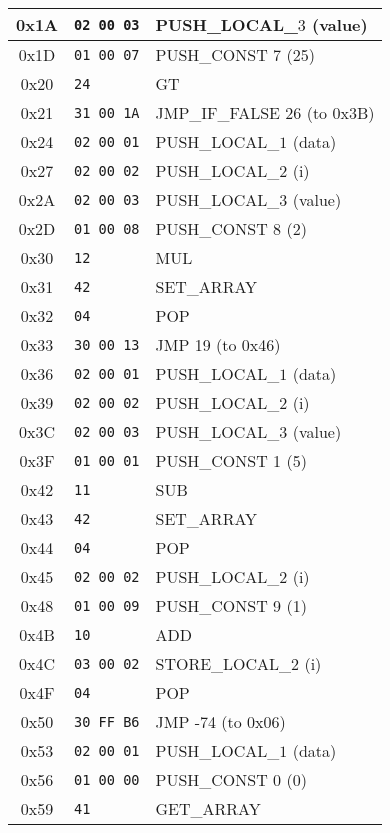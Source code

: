 \documentclass[a4paper,12pt]{article}
\begin{document}
\begin{longtable}{|c|l|p{6cm}|}
    0x1A & \texttt{02 00 03} & PUSH\_LOCAL\_$3$ (value) \\ \hline
    0x1D & \texttt{01 00 07} & PUSH\_CONST 7 (25) \\ \hline
    0x20 & \texttt{24} & GT \\ \hline
    0x21 & \texttt{31 00 1A} & JMP\_IF\_FALSE 26 (to 0x3B) \\ \hline
    0x24 & \texttt{02 00 01} & PUSH\_LOCAL\_$1$ (data) \\ \hline
    0x27 & \texttt{02 00 02} & PUSH\_LOCAL\_$2$ (i) \\ \hline
    0x2A & \texttt{02 00 03} & PUSH\_LOCAL\_$3$ (value) \\ \hline
    0x2D & \texttt{01 00 08} & PUSH\_CONST 8 (2) \\ \hline
    0x30 & \texttt{12} & MUL \\ \hline
    0x31 & \texttt{42} & SET\_ARRAY \\ \hline
    0x32 & \texttt{04} & POP \\ \hline
    0x33 & \texttt{30 00 13} & JMP 19 (to 0x46) \\ \hline
    0x36 & \texttt{02 00 01} & PUSH\_LOCAL\_$1$ (data) \\ \hline
    0x39 & \texttt{02 00 02} & PUSH\_LOCAL\_$2$ (i) \\ \hline
    0x3C & \texttt{02 00 03} & PUSH\_LOCAL\_$3$ (value) \\ \hline
    0x3F & \texttt{01 00 01} & PUSH\_CONST 1 (5) \\ \hline
    0x42 & \texttt{11} & SUB \\ \hline
    0x43 & \texttt{42} & SET\_ARRAY \\ \hline
    0x44 & \texttt{04} & POP \\ \hline
    0x45 & \texttt{02 00 02} & PUSH\_LOCAL\_$2$ (i) \\ \hline
    0x48 & \texttt{01 00 09} & PUSH\_CONST 9 (1) \\ \hline
    0x4B & \texttt{10} & ADD \\ \hline
    0x4C & \texttt{03 00 02} & STORE\_LOCAL\_$2$ (i) \\ \hline
    0x4F & \texttt{04} & POP \\ \hline
    0x50 & \texttt{30 FF B6} & JMP -74 (to 0x06) \\ \hline
    0x53 & \texttt{02 00 01} & PUSH\_LOCAL\_$1$ (data) \\ \hline
    0x56 & \texttt{01 00 00} & PUSH\_CONST 0 (0) \\ \hline
    0x59 & \texttt{41} & GET\_ARRAY \\ \hline

\end{longtable}
\end{document}
